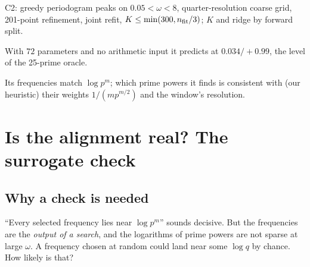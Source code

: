 \begin{keyideas}
\item C2: greedy periodogram peaks on $0.05<\omega<8$, quarter-resolution coarse grid, 201-point refinement, joint refit, $K\le\min(300,n_{\rm fit}/3)$; $K$ and ridge by forward split.
\item With $72$ parameters and no arithmetic input it predicts at $0.034/+0.99$, the level of the 25-prime oracle.
\item Its frequencies match $\log p^m$; which prime powers it finds is consistent with (our heuristic) their weights $1/(mp^{m/2})$ and the window's resolution.
\end{keyideas}

\section{Is the alignment real? The surrogate check}\label{sec:paper-arithmetic-surrogate}

\subsection{Why a check is needed}

``Every selected frequency lies near $\log p^m$'' sounds decisive. But the frequencies are the \emph{output of a search}, and the logarithms of prime powers are not sparse at large $\omega$. A frequency chosen at random could land near some $\log q$ by chance. How likely is that?


